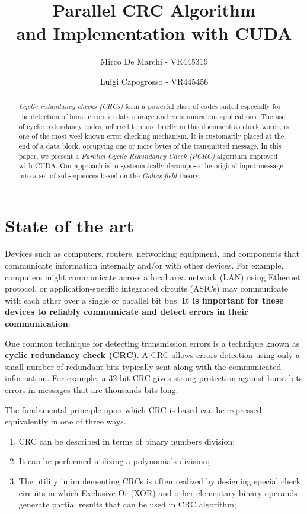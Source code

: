 \documentclass[fleqn]{IEEEtran}
\title
{
Parallel CRC Algorithm\\and Implementation with CUDA
}
\author{Mirco De Marchi - VR445319 \and Luigi Capogrosso - VR445456}
\begin{document}
\maketitle


\begin{abstract}
\textit{Cyclic redundancy checks (CRCs)} form a powerful class of codes suited especially 
for the detection of burst errors in data storage and communication 
applications. The use of cyclic redundancy codes, referred to more briefly 
in this document as check words, is one of the most weel known error checking mechanism. It is 
customarily placed at the end of a data block, occupying one or more bytes of the 
transmitted message. In this paper, we present a \textit{Parallel Cyclic 
Redundancy Check (PCRC)} algorithm improved with CUDA. Our approach is to 
systematically decompose the original input message into a set of subsequences 
based on the \textit{Galois field} theory.
\end{abstract}


\section{State of the art}
Devices such as computers, routers, networking equipment, and components 
that communicate information internally and/or with other devices. For 
example, computers might communicate across a local area network (LAN) using 
Ethernet protocol, or application-specific integrated circuits (ASICs) may 
communicate with each other over a single or parallel bit bus. \textbf{It is 
important for these devices to reliably communicate and detect errors in 
their communication}.

One common technique for detecting transmission errors is a technique known as 
\textbf{cyclic redundancy check (CRC)}. A CRC allows errors detection using 
only a small number of redundant bits typically sent along with the 
communicated information. For example, a 32-bit CRC gives strong protection 
against burst bits errors in messages that are thousands bits long. 

The fundamental principle upon which CRC is based can be expressed equivalently 
in one of three ways.

\begin{enumerate}
	\item CRC can be described in terms of binary numbers division;
	\item It can be performed utilizing a polynomials division;
	\item The utility in implementing CRCs is often realized by designing special 
	check circuits in which Exclusive Or (XOR) and other elementary binary 
	operands generate partial results that can be used in CRC algorithm;
\end{enumerate} 
\end{document}
